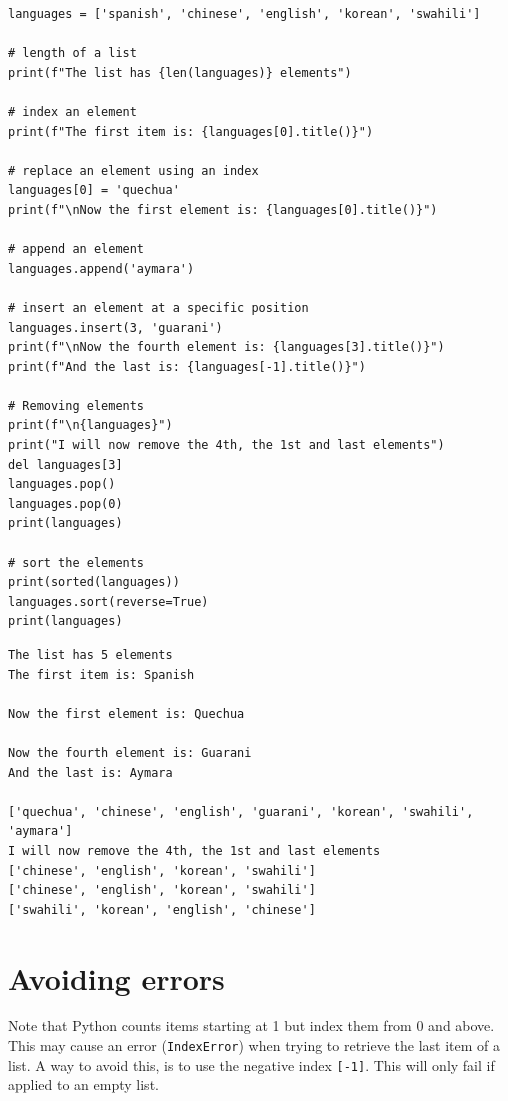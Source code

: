 \documentclass[10pt]{book}
\begin{document}
\begin{enumerate}
\begin{verbatim}
languages = ['spanish', 'chinese', 'english', 'korean', 'swahili']

# length of a list
print(f"The list has {len(languages)} elements")

# index an element
print(f"The first item is: {languages[0].title()}")

# replace an element using an index
languages[0] = 'quechua'
print(f"\nNow the first element is: {languages[0].title()}")

# append an element 
languages.append('aymara')

# insert an element at a specific position
languages.insert(3, 'guarani')
print(f"\nNow the fourth element is: {languages[3].title()}")
print(f"And the last is: {languages[-1].title()}")

# Removing elements
print(f"\n{languages}")
print("I will now remove the 4th, the 1st and last elements")
del languages[3]
languages.pop()
languages.pop(0)
print(languages)

# sort the elements
print(sorted(languages))
languages.sort(reverse=True)
print(languages)
\end{verbatim}

\label{org0b2f71c}
\begin{verbatim}
The list has 5 elements
The first item is: Spanish

Now the first element is: Quechua

Now the fourth element is: Guarani
And the last is: Aymara

['quechua', 'chinese', 'english', 'guarani', 'korean', 'swahili', 'aymara']
I will now remove the 4th, the 1st and last elements
['chinese', 'english', 'korean', 'swahili']
['chinese', 'english', 'korean', 'swahili']
['swahili', 'korean', 'english', 'chinese']
\end{verbatim}
\end{enumerate}
\section{Avoiding errors}
\label{sec:org41ae97d}
Note that Python counts items starting at 1 but index them from 0 and above. This may cause an error (\texttt{IndexError}) when trying to retrieve the last item of a list. A way to avoid this, is to use the negative index \texttt{[-1]}. This will only fail if applied to an empty list.
\end{document}
